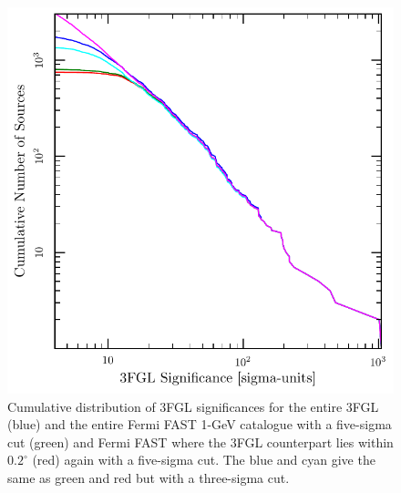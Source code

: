 \documentclass[useAMS,usenatbib]{mn2e}
\begin{document}
\begin{figure}
\includegraphics[width=\columnwidth]{sign-dist}
\caption{
  Cumulative distribution of 3FGL significances for the entire 3FGL
  (blue) and the entire Fermi FAST 1-GeV catalogue with a five-sigma
  cut (green) and Fermi FAST where the 3FGL counterpart lies within
  $0.2^\circ$ (red) again with a five-sigma cut.  The blue and cyan
  give the same as green and red but with a three-sigma cut.}
\label{fig:sign-dist}
\end{figure}
\end{document}
